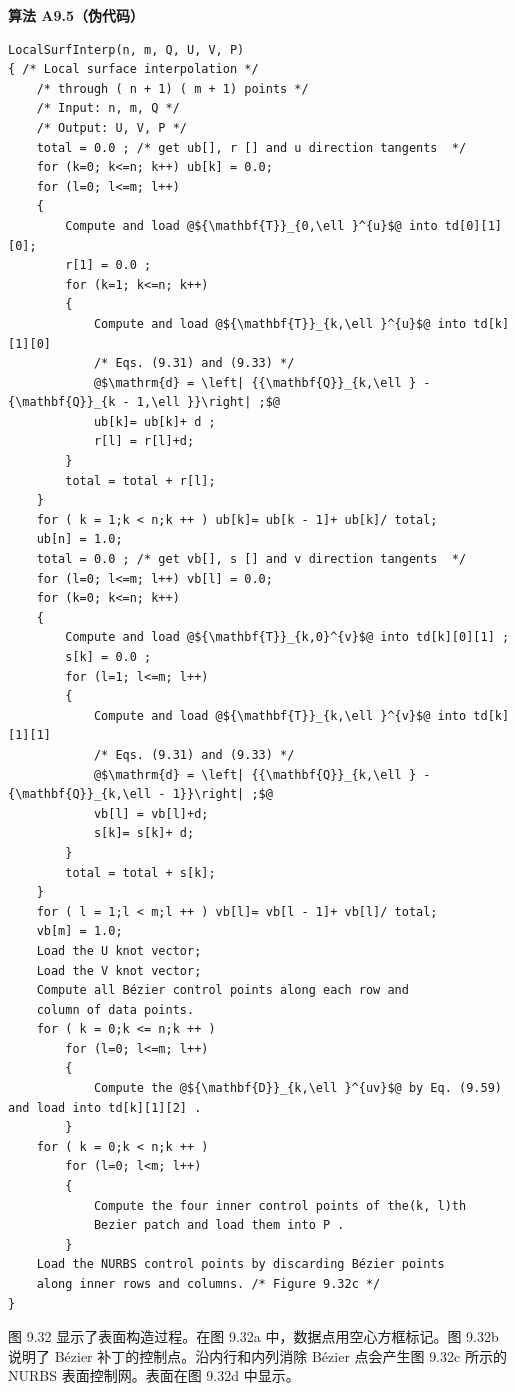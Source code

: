 \documentclass[../main.tex]{subfiles}
\begin{document}
\par\medskip\noindent\textbf{算法 A9.5（伪代码）}\par
\begin{verbatim}
LocalSurfInterp(n, m, Q, U, V, P)
{ /* Local surface interpolation */
    /* through ( n + 1) ( m + 1) points */
    /* Input: n, m, Q */
    /* Output: U, V, P */
    total = 0.0 ; /* get ub[], r [] and u direction tangents  */
    for (k=0; k<=n; k++) ub[k] = 0.0;
    for (l=0; l<=m; l++)
    {
        Compute and load @${\mathbf{T}}_{0,\ell }^{u}$@ into td[0][1][0];
        r[1] = 0.0 ;
        for (k=1; k<=n; k++)
        {
            Compute and load @${\mathbf{T}}_{k,\ell }^{u}$@ into td[k][1][0]
            /* Eqs. (9.31) and (9.33) */
            @$\mathrm{d} = \left| {{\mathbf{Q}}_{k,\ell } - {\mathbf{Q}}_{k - 1,\ell }}\right| ;$@
            ub[k]= ub[k]+ d ;
            r[l] = r[l]+d;
        }
        total = total + r[l];
    }
    for ( k = 1;k < n;k ++ ) ub[k]= ub[k - 1]+ ub[k]/ total;
    ub[n] = 1.0;
    total = 0.0 ; /* get vb[], s [] and v direction tangents  */
    for (l=0; l<=m; l++) vb[l] = 0.0;
    for (k=0; k<=n; k++)
    {
        Compute and load @${\mathbf{T}}_{k,0}^{v}$@ into td[k][0][1] ;
        s[k] = 0.0 ;
        for (l=1; l<=m; l++)
        {
            Compute and load @${\mathbf{T}}_{k,\ell }^{v}$@ into td[k][1][1]
            /* Eqs. (9.31) and (9.33) */
            @$\mathrm{d} = \left| {{\mathbf{Q}}_{k,\ell } - {\mathbf{Q}}_{k,\ell - 1}}\right| ;$@
            vb[l] = vb[l]+d;
            s[k]= s[k]+ d;
        }
        total = total + s[k];
    }
    for ( l = 1;l < m;l ++ ) vb[l]= vb[l - 1]+ vb[l]/ total;
    vb[m] = 1.0;
    Load the U knot vector;
    Load the V knot vector;
    Compute all Bézier control points along each row and
    column of data points.
    for ( k = 0;k <= n;k ++ )
        for (l=0; l<=m; l++)
        {
            Compute the @${\mathbf{D}}_{k,\ell }^{uv}$@ by Eq. (9.59) and load into td[k][1][2] .
        }
    for ( k = 0;k < n;k ++ )
        for (l=0; l<m; l++)
        {
            Compute the four inner control points of the(k, l)th
            Bezier patch and load them into P .
        }
    Load the NURBS control points by discarding Bézier points
    along inner rows and columns. /* Figure 9.32c */
}
\end{verbatim}

图 9.32 显示了表面构造过程。在图 9.32a 中，数据点用空心方框标记。图 9.32b 说明了 Bézier 补丁的控制点。沿内行和内列消除 Bézier 点会产生图 9.32c 所示的 NURBS 表面控制网。表面在图 9.32d 中显示。
\end{document}
